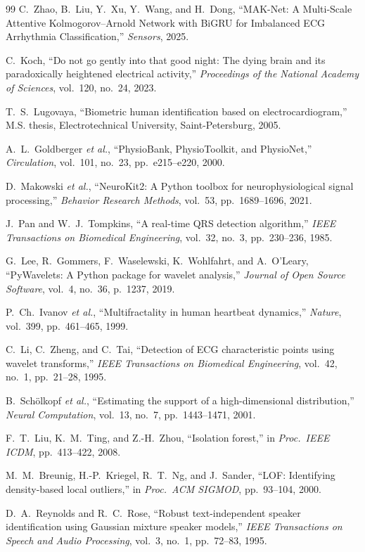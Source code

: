 \documentclass[12pt, a4paper]{article}
\begin{document}
\begin{thebibliography}{99}
C.~Zhao, B.~Liu, Y.~Xu, Y.~Wang, and H.~Dong,
``MAK-Net: A Multi-Scale Attentive Kolmogorov--Arnold Network with BiGRU
for Imbalanced ECG Arrhythmia Classification,''
\textit{Sensors}, 2025.

C.~Koch,
``Do not go gently into that good night: The dying brain and its paradoxically
heightened electrical activity,''
\textit{Proceedings of the National Academy of Sciences}, vol.~120, no.~24, 2023.

T.~S.~Lugovaya,
``Biometric human identification based on electrocardiogram,''
M.S. thesis, Electrotechnical University, Saint-Petersburg, 2005.

A.~L.~Goldberger \textit{et al.},
``PhysioBank, PhysioToolkit, and PhysioNet,''
\textit{Circulation}, vol.~101, no.~23, pp.~e215--e220, 2000.

D.~Makowski \textit{et al.},
``NeuroKit2: A Python toolbox for neurophysiological signal processing,''
\textit{Behavior Research Methods}, vol.~53, pp.~1689--1696, 2021.

J.~Pan and W.~J.~Tompkins,
``A real-time QRS detection algorithm,''
\textit{IEEE Transactions on Biomedical Engineering},
vol.~32, no.~3, pp.~230--236, 1985.

G.~Lee, R.~Gommers, F.~Waselewski, K.~Wohlfahrt, and A.~O'Leary,
``PyWavelets: A Python package for wavelet analysis,''
\textit{Journal of Open Source Software}, vol.~4, no.~36, p.~1237, 2019.

P.~Ch.~Ivanov \textit{et al.},
``Multifractality in human heartbeat dynamics,''
\textit{Nature}, vol.~399, pp.~461--465, 1999.

C.~Li, C.~Zheng, and C.~Tai,
``Detection of ECG characteristic points using wavelet transforms,''
\textit{IEEE Transactions on Biomedical Engineering},
vol.~42, no.~1, pp.~21--28, 1995.

B.~Sch\"olkopf \textit{et al.},
``Estimating the support of a high-dimensional distribution,''
\textit{Neural Computation}, vol.~13, no.~7, pp.~1443--1471, 2001.

F.~T.~Liu, K.~M.~Ting, and Z.-H.~Zhou,
``Isolation forest,''
in \textit{Proc.\ IEEE ICDM}, pp.~413--422, 2008.

M.~M.~Breunig, H.-P.~Kriegel, R.~T.~Ng, and J.~Sander,
``LOF: Identifying density-based local outliers,''
in \textit{Proc.\ ACM SIGMOD}, pp.~93--104, 2000.

D.~A.~Reynolds and R.~C.~Rose,
``Robust text-independent speaker identification using Gaussian mixture
speaker models,''
\textit{IEEE Transactions on Speech and Audio Processing},
vol.~3, no.~1, pp.~72--83, 1995.

\end{thebibliography}
\end{document}
